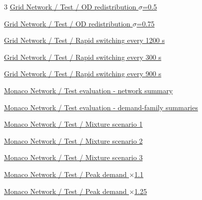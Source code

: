 \documentclass[11pt]{article}
\begin{document}
\begin{multicols}{3}
\noindent\hyperref[test-grid-redistribution_0.5]{Grid Network / Test / OD redistribution \ensuremath{\sigma}=0.5}\hfill\pageref*{test-grid-redistribution_0.5}\par\vspace{3pt}
\noindent\hyperref[test-grid-redistribution_0.75]{Grid Network / Test / OD redistribution \ensuremath{\sigma}=0.75}\hfill\pageref*{test-grid-redistribution_0.75}\par\vspace{3pt}
\noindent\hyperref[test-grid-switch_1200]{Grid Network / Test / Rapid switching every 1200 s}\hfill\pageref*{test-grid-switch_1200}\par\vspace{3pt}
\noindent\hyperref[test-grid-switch_300]{Grid Network / Test / Rapid switching every 300 s}\hfill\pageref*{test-grid-switch_300}\par\vspace{3pt}
\noindent\hyperref[test-grid-switch_900]{Grid Network / Test / Rapid switching every 900 s}\hfill\pageref*{test-grid-switch_900}\par\vspace{3pt}
\noindent\hyperref[test-monaco-summary]{Monaco Network / Test evaluation - network summary}\hfill\pageref*{test-monaco-summary}\par\vspace{3pt}
\noindent\hyperref[test-monaco-families]{Monaco Network / Test evaluation - demand-family summaries}\hfill\pageref*{test-monaco-families}\par\vspace{3pt}
\noindent\hyperref[test-monaco-mixture_1]{Monaco Network / Test / Mixture scenario 1}\hfill\pageref*{test-monaco-mixture_1}\par\vspace{3pt}
\noindent\hyperref[test-monaco-mixture_2]{Monaco Network / Test / Mixture scenario 2}\hfill\pageref*{test-monaco-mixture_2}\par\vspace{3pt}
\noindent\hyperref[test-monaco-mixture_3]{Monaco Network / Test / Mixture scenario 3}\hfill\pageref*{test-monaco-mixture_3}\par\vspace{3pt}
\noindent\hyperref[test-monaco-peak_1.1]{Monaco Network / Test / Peak demand \ensuremath{\times}1.1}\hfill\pageref*{test-monaco-peak_1.1}\par\vspace{3pt}
\noindent\hyperref[test-monaco-peak_1.25]{Monaco Network / Test / Peak demand \ensuremath{\times}1.25}\hfill\pageref*{test-monaco-peak_1.25}\par\vspace{3pt}

\end{multicols}
\end{document}
